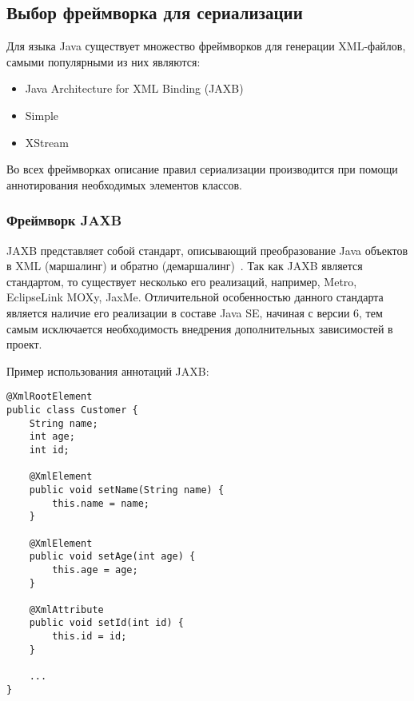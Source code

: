 \subsection{Выбор фреймворка для сериализации}

Для языка Java существует множество фреймворков для генерации XML-файлов,
самыми популярными из них являются:


\begin{itemize}
    \item Java Architecture for XML Binding (JAXB)
    \item Simple
    \item XStream
\end{itemize}

Во всех фреймворках описание правил сериализации производится при помощи
аннотирования необходимых элементов классов.

\subsubsection{Фреймворк JAXB}

JAXB представляет собой стандарт, описывающий преобразование Java объектов в XML
(маршалинг) и обратно (демаршалинг)~\cite{jaxb}. Так как JAXB является
стандартом, то существует несколько его реализаций, например, Metro, EclipseLink
MOXy, JaxMe. Отличительной особенностью данного стандарта является наличие его
реализации в составе Java SE, начиная с версии 6, тем самым исключается
необходимость внедрения дополнительных зависимостей в проект.

Пример использования аннотаций JAXB:

\begin{lstlisting}[caption={Пример использования фреймворка JAXB}]
@XmlRootElement
public class Customer {
    String name;
    int age;
    int id;

    @XmlElement
    public void setName(String name) {
        this.name = name;
    }

    @XmlElement
    public void setAge(int age) {
        this.age = age;
    }

    @XmlAttribute
    public void setId(int id) {
        this.id = id;
    }

    ...
}
\end{lstlisting}

